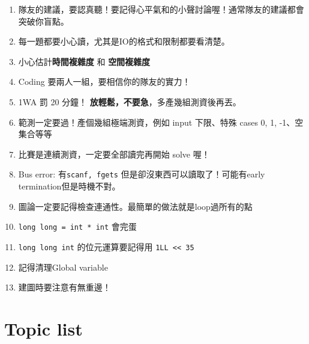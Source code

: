 \documentclass[10pt,oneside]{article}
\begin{document}
\begin{landscape}
\begin{multicols}{2}
{\large
\begin{enumerate}
	\item 隊友的建議，要認真聽！要記得心平氣和的小聲討論喔！通常隊友的建議都會突破你盲點。
	\item 每一題都要小心讀，尤其是IO的格式和限制都要看清楚。%
	\item 小心估計\textbf{時間複雜度} 和 \textbf{空間複雜度}%
	\item Coding 要兩人一組，要相信你的隊友的實力！
	\item 1WA 罰 20 分鐘！ \textbf{放輕鬆，不要急}，多產幾組測資後再丟。%
	\item 範測一定要過！產個幾組極端測資，例如 input 下限、特殊 cases 0, 1, -1、空集合等等 %
	\item 比賽是連續測資，一定要全部讀完再開始 solve 喔！%
	\item Bus error: 有\texttt{scanf, fgets} 但是卻沒東西可以讀取了！可能有early termination但是時機不對。 %
	\item 圖論一定要記得檢查連通性。最簡單的做法就是loop過所有的點%
	\item \texttt{long long = int * int} 會完蛋%
	\item \texttt{long long int} 的位元運算要記得用 \texttt{1LL << 35} %
	\item 記得清理Global variable
	\item 建圖時要注意有無重邊！
\end{enumerate}
}

\section{Topic list}


\end{multicols}
\end{landscape}
\end{document}
